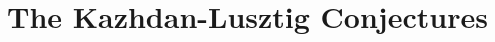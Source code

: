             \minitoc
            
            
            
            
            
        \chapter{The Kazhdan-Lusztig Conjectures}
	
	\printbibliography

